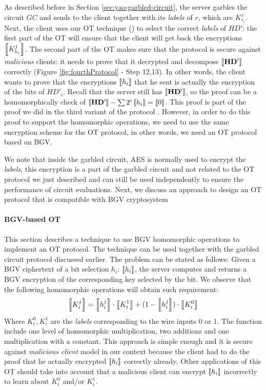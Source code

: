 As described before in Section \ref{sec:yao-garbled-circuit}, the server garbles
the circuit \(GC\) and sends to the client together with its \textit{labels} of
\(r\), which are \(K_{r_{i}}^{j}\). Next, the client uses our OT technique
(\missref{}) to select the correct \textit{labels} of \(HD'\): the first part of
the OT will ensure that the client will get back the encryptions
\(\left\llbracket K_{h_{i}}^{j}\right\rrbracket\). The second part of the OT makes sure that the protocol
is secure against \textit{malicious} clients: it needs to prove that it
decrypted and decompose \(\left\llbracket\mathbf{HD'}\right\rrbracket\) correctly (Figure
\ref{fig:fourthProtocol} - Step 12,13). In other words, the client wants to
prove that the encryptions \(\left\llbracket h_{i}\right\rrbracket\) that he sent is actually the
encryption of the bits of \(HD'_{i}\). Recall that the server still has
\(\left\llbracket\mathbf{HD'}\right\rrbracket\), so the proof can be a homomorphically check of
\(\left\llbracket\mathbf{HD'}\right\rrbracket - \sum{2^{i}\left\llbracket h_{i}\right\rrbracket} = \left\llbracket0\right\rrbracket\). This proof is part of
the proof we did in the third variant of the protocol \missref{}. However, in
order to do this proof to support the homomorphic operations, we need to use the
same encryption scheme for the OT protocol, in other words, we need an OT
protocol based on BGV.

We note that inside the garbled circuit, AES is normally used to encrypt the
\textit{labels}, this encryption is a part of the garbled circuit and not
related to the OT protocol we just described and can still be used independently
to ensure the performance of circuit evaluations. Next, we discuss an approach
to design an OT protocol that is compatible with BGV cryptosystem

\paragraph{BGV-based OT}

This section describes a technique to use BGV homomorphic operations to
implement an OT protocol. The technique can be used together with the garbled
circuit protocol discussed earlier. The problem can be stated as follows: Given
a BGV ciphertext of a bit selection \(h_{i}\): \(\left\llbracket h_{i}\right\rrbracket\), the server
computes and returns a BGV encryption of the corresponding key selected by the
bit. We observe that the following homomorphic operations will obtain such
requirement:
\[
\left\llbracket K_{i}^{j}\right\rrbracket = \left\llbracket h_{i}^{j}\right\rrbracket \cdot \left\llbracket K_{i}^{1}\right\rrbracket + (1 - \left\llbracket h_{i}^{j}\right\rrbracket) \cdot \left\llbracket K_{i}^{0}\right\rrbracket
\]
Where \(K_{i}^{0}, K_{i}^{1}\) are the \textit{labels} corresponding to the wire
inputs 0 or 1. The function include one level of homomorphic multiplication, two
additions and one multiplication with a constant. This approach is simple enough
and it is secure against \textit{malicious client} model in our context because
the client had to do the proof that he actually encrypted \(\left\llbracket h_{i}\right\rrbracket\)
correctly already. Other applications of this OT should take into account that a
malicious client can encrypt \(\left\llbracket h_{i}\right\rrbracket\) incorrectly to learn about
\(K_{i}^{0}\) and/or \(K_{i}^{1}\).

